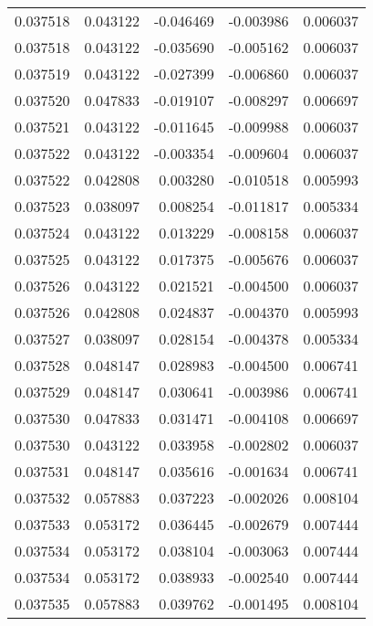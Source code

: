 \begin{tabular}{lrrrr}
0.037518    &  0.043122 & -0.046469 & -0.003986 &             0.006037 \\
0.037518    &  0.043122 & -0.035690 & -0.005162 &             0.006037 \\
0.037519    &  0.043122 & -0.027399 & -0.006860 &             0.006037 \\
0.037520    &  0.047833 & -0.019107 & -0.008297 &             0.006697 \\
0.037521    &  0.043122 & -0.011645 & -0.009988 &             0.006037 \\
0.037522    &  0.043122 & -0.003354 & -0.009604 &             0.006037 \\
0.037522    &  0.042808 &  0.003280 & -0.010518 &             0.005993 \\
0.037523    &  0.038097 &  0.008254 & -0.011817 &             0.005334 \\
0.037524    &  0.043122 &  0.013229 & -0.008158 &             0.006037 \\
0.037525    &  0.043122 &  0.017375 & -0.005676 &             0.006037 \\
0.037526    &  0.043122 &  0.021521 & -0.004500 &             0.006037 \\
0.037526    &  0.042808 &  0.024837 & -0.004370 &             0.005993 \\
0.037527    &  0.038097 &  0.028154 & -0.004378 &             0.005334 \\
0.037528    &  0.048147 &  0.028983 & -0.004500 &             0.006741 \\
0.037529    &  0.048147 &  0.030641 & -0.003986 &             0.006741 \\
0.037530    &  0.047833 &  0.031471 & -0.004108 &             0.006697 \\
0.037530    &  0.043122 &  0.033958 & -0.002802 &             0.006037 \\
0.037531    &  0.048147 &  0.035616 & -0.001634 &             0.006741 \\
0.037532    &  0.057883 &  0.037223 & -0.002026 &             0.008104 \\
0.037533    &  0.053172 &  0.036445 & -0.002679 &             0.007444 \\
0.037534    &  0.053172 &  0.038104 & -0.003063 &             0.007444 \\
0.037534    &  0.053172 &  0.038933 & -0.002540 &             0.007444 \\
0.037535    &  0.057883 &  0.039762 & -0.001495 &             0.008104 \\

\end{tabular}
